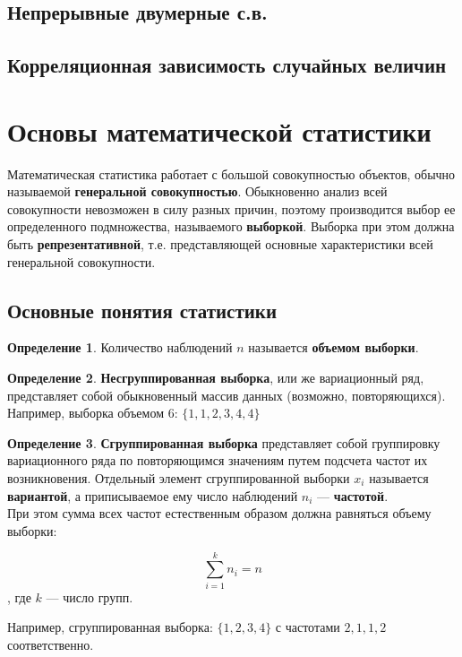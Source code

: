 \documentclass[12pt,a4paper]{article}
\theoremstyle{definition}
\newtheorem{definition}{Определение}[section]
\theoremstyle{definition}
\theoremstyle{remark}
\theoremstyle{corollary}
\theoremstyle{bolditalic}
\begin{document}
\subsection{Непрерывные двумерные с.в.}

\subsection{Корреляционная зависимость случайных величин}


\section{Основы математической статистики}

Математическая статистика работает с большой совокупностью объектов, обычно называемой \textbf{генеральной совокупностью}. Обыкновенно анализ всей совокупности невозможен в силу разных причин, поэтому производится выбор ее определенного подмножества, называемого \textbf{выборкой}. Выборка при этом должна быть \textbf{репрезентативной}, т.е. представляющей основные характеристики всей генеральной совокупности.

\subsection{Основные понятия статистики}

\begin{definition}
    Количество наблюдений $n$ называется \textbf{объемом выборки}.
\end{definition}

\begin{definition}
    \textbf{Несгруппированная выборка}, или же вариационный ряд, представляет собой обыкновенный массив данных (возможно, повторяющихся).\\

    Например, выборка объемом 6: $\{1, 1, 2, 3, 4, 4\}$
\end{definition}

\begin{definition}
    \textbf{Сгруппированная выборка} представляет собой группировку вариационного ряда по повторяющимся значениям путем подсчета частот их возникновения. Отдельный элемент сгруппированной выборки $x_i$ называется \textbf{вариантой}, а приписываемое ему число наблюдений $n_i$ --- \textbf{частотой}.\\

    При этом сумма всех частот естественным образом должна равняться объему выборки:

    \[
    \sum_{i=1}^{k}{n_i}=n
    \]
    , где $k$ --- число групп.

    Например, сгруппированная выборка: $\{1, 2, 3, 4\}$ с частотами $2, 1, 1, 2$ соответственно.
\end{definition}
\end{document}

